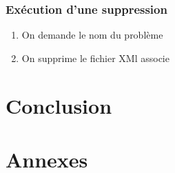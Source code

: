 \documentclass[11pt]{report}
\begin{document}
\newpage\subsection{Exécution d'une suppression}
\begin{enumerate}
\item On demande le nom du problème 
\item On supprime le fichier XMl associe 
\end{enumerate}
\chapter{Conclusion}


\chapter{Annexes}
\end{document}
